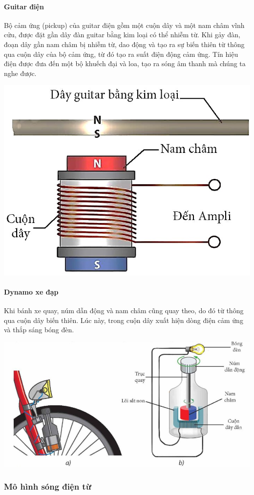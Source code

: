 \begin{tomtat}
	\paragraph{Guitar điện}
	\begin{minipage}{0.5\textwidth}
		Bộ cảm ứng (pickup) của guitar điện gồm một cuộn dây và một nam châm vĩnh cửu, được đặt gần dây đàn guitar bằng kim loại có thể nhiễm từ. Khi gảy đàn, đoạn dây gần nam châm bị nhiễm từ, dao động và tạo ra sự biến thiên từ thông qua cuộn dây của bộ cảm ứng, từ đó tạo ra suất điện động cảm ứng. Tín hiệu điện được đưa đến một bộ khuếch đại và loa, tạo ra sóng âm thanh mà chúng ta nghe được.
	\end{minipage}
	\hfill
	\begin{minipage}{0.5\textwidth}
		\centering
		\includegraphics[width=0.55\linewidth]{figs/VN12-Y24-PH-SYL-021-1}
	\end{minipage}
	\paragraph{Dynamo xe đạp}
	Khi bánh xe quay, núm dẫn  động và nam châm cũng quay theo, do đó từ thông qua cuộn dây biến thiên. Lúc này, trong cuộn dây xuất hiện dòng điện cảm ứng và thắp sáng bóng đèn.
	\begin{center}
		\includegraphics[width=0.6\linewidth]{figs/VN12-Y24-PH-SYL-021-2}
	\end{center}
	\subsubsection{Mô hình sóng điện từ}

\end{tomtat}
